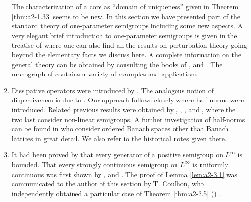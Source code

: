 \begin{enumerate}[label=\emph{Section \arabic*:}, wide, itemsep=1ex]
The characterization of a core as \enquote{domain of uniqueness} given in Theorem \ref{thm:a2-1.33}   seems to be new.
In this section we have presented part of the standard theory of one-parameter semigroups including some new aspects.
A very elegant brief introduction to one-parameter semigroups is given in the treatise of \citet{kato:1966} where one can also find all the results on perturbation theory going beyond the elementary facts we discuss here.
A complete information on the general theory can be obtained by consulting the books of \citet{davies:1980}, \citet{goldstein:1985a} and \citet{pazy:1983}.
The monograph of \citet{goldstein:1985a} contains a variety of examples and applications.

\item 
Dissipative operators were introduced by \citet{lumerphillips:1961}.
The analogous notion of dispersiveness is due to \citet{phillips:1962}.
Our approach follows closely \citet{arendtchernoffkato:1982} where half-norms were introduced.
Related previous results were obtained by \citet{calvert:1971a}, \citet{hasegawa:1966}, \citet{sato:1968}, \citet{benilanpicard:1979} and \citet{picard:1972}, where the two last consider non-linear semigroups.
A further investigation of half-norms can be found in \citet{battyrobinson:1984} who consider ordered Banach spaces other than Banach lattices in great detail.
We also refer to the historical notes given there.

\item
It had been proved by \citet{kishimotorobinson:1981} that every generator of a positive semigroup on $L^{\infty}$ is bounded.
That every strongly continuous semigroup on $L^{\infty}$ is uniformly continuous was first shown by \citet{lotz:1982}, \citet{lotz:1984} and \citet{lotz:1985}.
The proof of Lemma \ref{lem:a2-3.1}  was communicated to the author of this section by T. Coulhon, who independently obtained a particular case of Theorem \ref{thm:a2-3.5} (\citet{coulhon:1984}) .

\end{enumerate}

{\RaggedRight

}
